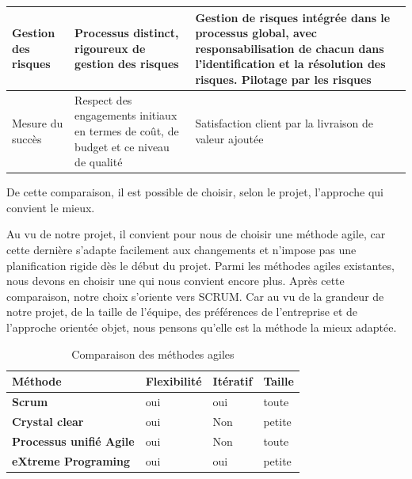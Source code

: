 \begin{table}[H]
\begin{tabular}{|l|p{5cm}|p{6cm}|}
		Gestion des risques & Processus distinct, rigoureux de gestion des risques                                                   & Gestion de risques intégrée dans le processus global, avec responsabilisation de chacun dans l’identification et la résolution des risques. Pilotage par les risques \\ \hline
		Mesure du succès    & Respect des engagements initiaux en termes de coût, de budget et ce niveau de qualité                  & Satisfaction client par la livraison de valeur ajoutée                                                                                                               \\ \hline
	\end{tabular}
\end{table}

De cette comparaison, il est possible de choisir, selon le projet, l’approche qui convient le
mieux.

Au vu de notre projet, il convient pour nous de choisir une méthode agile, car cette dernière
s’adapte facilement aux changements et n’impose pas une planification rigide dès le début du
projet. Parmi les méthodes agiles existantes, nous devons en choisir une qui nous convient
encore plus. Après cette comparaison, notre choix s’oriente vers SCRUM.
Car au vu de la grandeur de notre projet, de la taille de l’équipe, des préférences de l’entreprise et de l’approche orientée objet, nous pensons qu’elle est la méthode la mieux adaptée.

\begin{table}[H]
	\centering
	\caption{Comparaison des méthodes agiles}
	\label{tab:my-table}
	\begin{tabular}{|l|l|l|l|}
		\hline
		\textbf{Méthode}                & \textbf{Flexibilité} & \textbf{Itératif} & \textbf{Taille} \\ \hline
		\textbf{Scrum}                  & oui                  & oui               & toute           \\ \hline
		\textbf{Crystal clear}          & oui                  & Non               & petite          \\ \hline
		\textbf{Processus unifié Agile} & oui                  & Non               & toute           \\ \hline
		\textbf{eXtreme Programing}     & oui                  & oui               & petite          \\ \hline
	\end{tabular}
\end{table}

